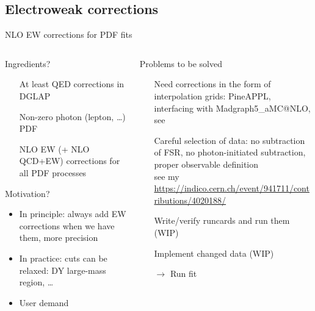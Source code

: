\author[Christopher Schwan]{}

\subsection{Electroweak corrections}

\begin{frame}{NLO EW corrections for PDF fits}
\fontsize{9}{11}\selectfont
\begin{columns}[onlytextwidth]
\begin{column}{0.45\textwidth}

\begin{block}{Ingredients?}
\begin{itemize}
\item[\ding{51}] At least QED corrections in DGLAP
\item[\ding{55}] Non-zero photon (lepton, \ldots) PDF
\item[\ding{55}] NLO EW (+ NLO QCD+EW) corrections for all PDF processes
\end{itemize}
\end{block}

\vspace*{0.5cm}

\begin{block}{Motivation?}
\begin{itemize}
\item In principle: always add EW corrections when we have them, more precision
\item In practice: cuts can be relaxed: DY large-mass region, \ldots
\item User demand
\end{itemize}
\end{block}
\end{column}
\begin{column}{0.45\textwidth}
\begin{block}{Problems to be solved}
\begin{itemize}
\item[\ding{51}] Need corrections in the form of \alert{interpolation grids}: PineAPPL, interfacing with Madgraph5\_aMC@NLO, see\\
\item[\ding{51}] Careful selection of data: no subtraction of FSR, no photon-initiated subtraction, proper observable definition\\
see my \href{LHCEWWG meeting 2020 talk}{https://indico.cern.ch/event/941711/contributions/4020188/}
\item[\ding{55}] Write/verify runcards and run them (WIP)
\item[\ding{55}] Implement changed data (WIP)
\item[$\rightarrow$] Run fit
\end{itemize}
\end{block}
\end{column}
\end{columns}
\end{frame}

